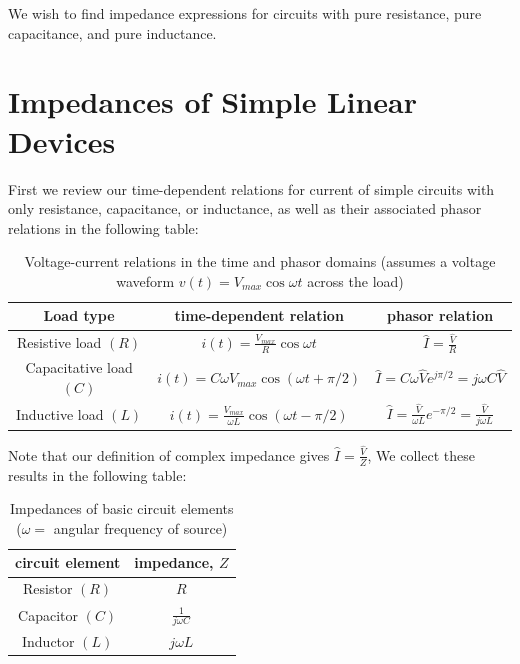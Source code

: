 \documentclass[12pt, a4paper, oneside, openright, titlepage]{book}
\begin{document}
We wish to find impedance expressions for circuits with pure resistance, pure capacitance, and pure inductance.

\section{Impedances of Simple Linear Devices}

First we review our time-dependent relations for current of simple circuits with only resistance, capacitance, or inductance, as well as their associated phasor relations in the following table:

\begin{table}[H]
    \centering
    \caption{Voltage-current relations in the time and phasor domains (assumes a voltage waveform $v(t) = V_{max}\cos\omega t$ across the load)}
    \begin{tabular}{c|c|c}
        Load type & time-dependent relation & phasor relation \\ \hline
        Resistive load $(R)$ & $i(t) = \frac{V_{max}}{R}\cos\omega t$ & $\hat{I} = \frac{\hat{V}}{R}$ \\
        Capacitative load $(C)$ & $i(t) = C\omega V_{max}\cos(\omega t + \pi/2)$ & $\hat{I} = C\omega \hat{V}e^{j\pi/2} = j\omega C\hat{V}$ \\ 
        Inductive load $(L)$ & $i(t) = \frac{V_{max}}{\omega L}\cos(\omega t-\pi/2)$ & $\hat{I} = \frac{\hat{V}}{\omega L}e^{-\pi/2} = \frac{\hat{V}}{j\omega L}$ \\ \hline
    \end{tabular}
    \label{tag:simpleLoads}
\end{table}

Note that our definition of complex impedance gives $\hat{I} = \frac{\hat{V}}{Z}$, We collect these results in the following table:


\begin{table}[H]
    \centering
    \caption{Impedances of basic circuit elements ($\omega = $ angular frequency of source)}
    \begin{tabular}{c|c}
        circuit element & impedance, $Z$ \\ \hline 
        Resistor $(R)$ & $R$ \\ 
        Capacitor $(C)$ & $\frac{1}{j\omega C}$ \\
        Inductor $(L)$ & $j\omega L$ \\ \hline
    \end{tabular}
    \label{tag:simpleLoadsImpedances}
\end{table}
\end{document}
